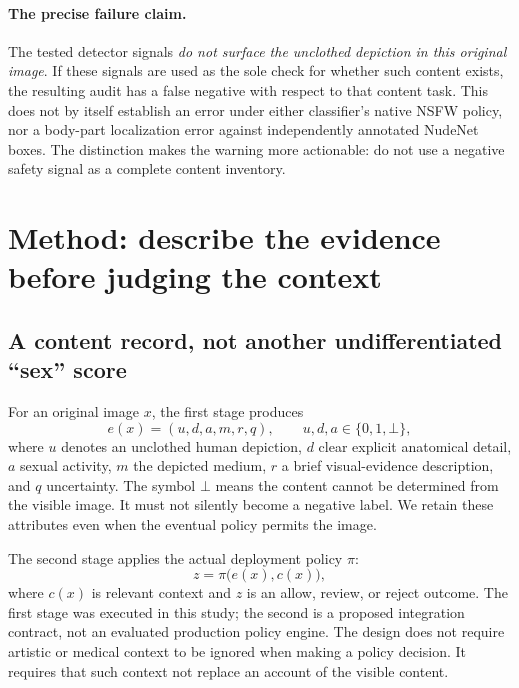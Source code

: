 \documentclass[11pt]{article}
\begin{document}
\paragraph{The precise failure claim.}
The tested detector signals \emph{do not surface the unclothed depiction in
this original image}. If these signals are used as the sole check for whether
such content exists, the resulting audit has a false negative with respect to
that content task. This does not by itself establish an error under either
classifier's native NSFW policy, nor a body-part localization error against
independently annotated NudeNet boxes. The distinction makes the warning more
actionable: do not use a negative safety signal as a complete content inventory.

\section{Method: describe the evidence before judging the context}
\label{sec:method}

\subsection{A content record, not another undifferentiated ``sex'' score}

For an original image $x$, the first stage produces
\begin{equation}
e(x)=(u,d,a,m,r,q), \qquad u,d,a\in\{0,1,\bot\},
\label{eq:record}
\end{equation}
where $u$ denotes an unclothed human depiction, $d$ clear explicit anatomical
detail, $a$ sexual activity, $m$ the depicted medium, $r$ a brief visual-evidence
description, and $q$ uncertainty. The symbol $\bot$ means the content cannot be
determined from the visible image. It must not silently become a negative
label. We retain these attributes even when the eventual policy permits the
image.

The second stage applies the actual deployment policy $\pi$:
\begin{equation}
z=\pi\big(e(x),c(x)\big),
\label{eq:policy}
\end{equation}
where $c(x)$ is relevant context and $z$ is an allow, review, or reject outcome.
The first stage was executed in this study; the second is a proposed integration
contract, not an evaluated production policy engine. The design does not
require artistic or medical context to be ignored when making a policy
decision. It requires that such context not replace an account of the visible
content.
\end{document}
